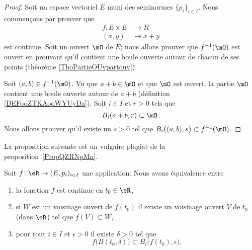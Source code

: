 \begin{proof}
    Soit un espace vectoriel \( E\) muni des seminormes \( \{ p_i \}_{i\in I}\). Nous commençons par prouver que 
    \begin{equation}
        \begin{aligned}
            f\colon E\times E&\to R \\
            (x,y)&\mapsto x+y 
        \end{aligned}
    \end{equation}
    est continue. Soit un ouvert \( \mO\) de \( E\); nous allons prouver que \( f^{-1}(\mO)\) est ouvert en prouvant qu'il contient une boule ouverte autour de chacun de ses points (théorème \ref{ThoPartieOUvpartouv}).

    Soit \( (a,b)\in f^{-1}(\mO)\). Vu que \( a+b\in \mO\) et que \( \mO\) est ouvert, la partie \( \mO\) contient une boule ouverte autour de \( a+b\) (définition \ref{DEFooZTKAooWYUyDa}). Soit \( i\in I\) et \( r>0\) tels que 
    \begin{equation}
        B_i(a+b,r)\subset \mO.
    \end{equation}
    Nous allons prouver qu'il existe un \( s>0\) tel que \( B_i\big( (a,b),s \big)\subset f^{-1}(\mO)\).
\end{proof}


La proposition suivante est un vulgaire plagiat de la proposition~\ref{PropQZRNpMn}.
\begin{proposition} \label{PropNGjQnqF}
    Soit \( f\colon \eR\to (E,p_i)_{i\in I}\) une application. Nous avons équivalence entre
    \begin{enumerate}
        \item   \label{ItemHNxGMpCi}
            la fonction \( f\) est continue en \( t_0\in \eR\),
        \item\label{ItemHNxGMpCii}
            si \( W\) est un voisinage ouvert de \( f(t_0)\) il existe un voisinage ouvert \( V\) de \( t_0\) (dans \( \eR\)) tel que \( f(V)\subset W\),
        \item\label{ItemHNxGMpCiii}
            pour tout \( i\in I\) et \( \epsilon>0\) il existe \( \delta>0\) tel que
            \begin{equation}
                f\big( B(t_0,\delta) \big)\subset B_i\big( f(t_0),\epsilon \big).
            \end{equation}
    \end{enumerate}
\end{proposition}

